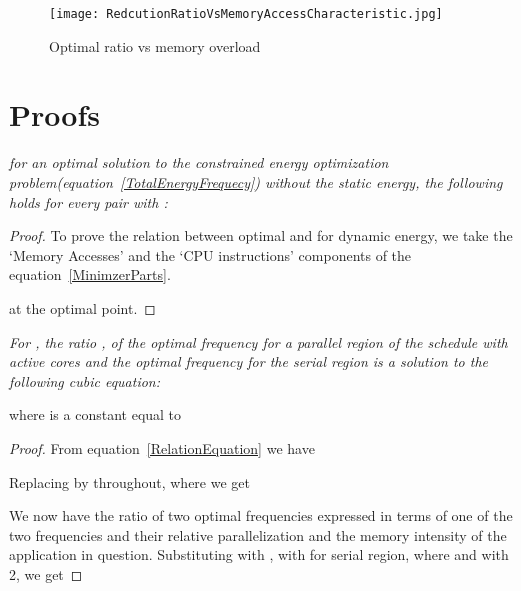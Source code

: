 \documentclass[11pt, letterpaper]{article}
\newenvironment{oldlem}[1]{\par\noindent{\bf Lemma #1:}
  \em \noindent}{\par}
\newcommand{\olem}[1]{\begin{oldlem}{\ref{#1}}}
\newcommand{\eolem}{\end{oldlem} \medskip}
\begin{document}
 \begin{figure}[h!]
  \begin{center}
   \texttt{[image: RedcutionRatioVsMemoryAccessCharacteristic.jpg]}
  \end{center}
  \vspace*{-15mm}
   \caption{Optimal ratio vs memory overload}
   \label{figure: ReductionRatio}
 \end{figure}
 
 
 
\section{Proofs}

\olem{Relation}
for an optimal solution  to the constrained energy optimization problem(equation~\ref{TotalEnergyFrequecy}) without the static energy, the following holds for every pair  with :\\
 
\eolem

\begin{proof}
 To prove the relation between optimal  and  for dynamic energy, we take the `Memory Accesses' and the `CPU instructions' components of the equation~\ref{MinimzerParts}.
  
  at the optimal point.
  
 
\end{proof}

\olem{CubicEquation}
 For , the ratio , of the optimal frequency  for a parallel region of the schedule with  active cores and the optimal frequency  for the serial region is a solution to the following cubic equation:
 
 where  is a constant equal to 
\eolem
\begin{proof}
 From equation~\ref{RelationEquation} we have
 
 Replacing  by  throughout, where  we get
 
 We now have the ratio of two optimal frequencies expressed in terms of one of the two frequencies  and their relative parallelization  and the memory intensity of the application in question. 
 Substituting  with ,  with  for serial region,  where   and  with 2, we get 
 
\end{proof}
\end{document}
